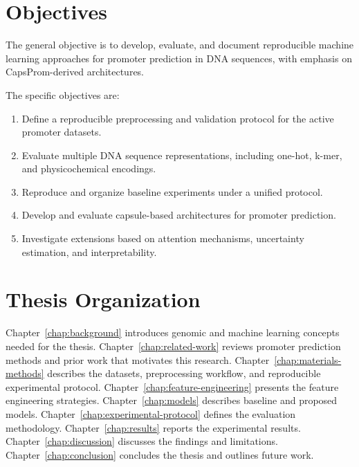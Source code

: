 \section{Objectives}\label{sec:intro-objectives}

The general objective is to develop, evaluate, and document reproducible machine
learning approaches for promoter prediction in DNA sequences, with emphasis on
CapsProm-derived architectures.

The specific objectives are:

\begin{enumerate}
    \item Define a reproducible preprocessing and validation protocol for the active promoter datasets.
    \item Evaluate multiple DNA sequence representations, including one-hot, k-mer, and physicochemical encodings.
    \item Reproduce and organize baseline experiments under a unified protocol.
    \item Develop and evaluate capsule-based architectures for promoter prediction.
    \item Investigate extensions based on attention mechanisms, uncertainty estimation, and interpretability.
\end{enumerate}

\section{Thesis Organization}\label{sec:intro-organization}

Chapter~\ref{chap:background} introduces genomic and machine learning concepts
needed for the thesis. Chapter~\ref{chap:related-work} reviews promoter
prediction methods and prior work that motivates this research. Chapter~\ref{chap:materials-methods}
describes the datasets, preprocessing workflow, and reproducible experimental protocol.
Chapter~\ref{chap:feature-engineering} presents the feature engineering
strategies. Chapter~\ref{chap:models} describes baseline and proposed models.
Chapter~\ref{chap:experimental-protocol} defines the evaluation methodology.
Chapter~\ref{chap:results} reports the experimental results. Chapter~\ref{chap:discussion}
discusses the findings and limitations. Chapter~\ref{chap:conclusion} concludes
the thesis and outlines future work.
